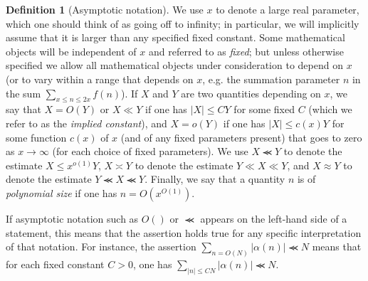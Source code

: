 \documentclass[12pt,a4paper,reqno]{amsart}
\numberwithin{equation}{section}
\theoremstyle{plain}
\theoremstyle{definition}
\newtheorem{definition}[theorem]{Definition}
\renewcommand{\sim}{\asymp}
\renewcommand{\lessapprox}{\llcurly}
\begin{document}
\begin{definition}[Asymptotic notation]\label{asym}  We use $x$ to denote a large real parameter, which one should think of as going off to infinity; in particular, we will implicitly assume that it is larger than any specified fixed constant. Some mathematical objects will be independent of $x$ and referred to as \emph{fixed}; but unless otherwise specified we allow all mathematical objects under consideration to depend on $x$ (or to vary within a range that depends on $x$, e.g. the summation parameter $n$ in the sum $\sum_{x \leq n \leq 2x} f(n)$).  If $X$ and $Y$ are two quantities depending on $x$, we say that $X = O(Y)$ or $X \ll Y$ if one has $|X| \leq CY$ for some fixed $C$ (which we refer to as the \emph{implied constant}), and $X = o(Y)$ if one has $|X| \leq c(x) Y$ for some function $c(x)$ of $x$ (and of any fixed parameters present) that goes to zero as $x \to \infty$ (for each choice of fixed parameters).  We use $X \lessapprox Y$ to denote the estimate $X \leq x^{o(1)} Y$, $X \sim Y$ to denote the estimate $Y \ll X \ll Y$, and $X \approx Y$ to denote the estimate $Y \lessapprox X \lessapprox Y$.  Finally, we say that a quantity $n$ is of \emph{polynomial size} if one has $n = O(x^{O(1)})$.

If asymptotic notation such as $O()$ or $\lessapprox$ appears on the left-hand side of a statement, this means that the assertion holds true for any specific interpretation of that notation.  For instance, the assertion $\sum_{n=O(N)} |\alpha(n)| \lessapprox N$ means that for each fixed constant $C>0$, one has $\sum_{|n| \leq CN} |\alpha(n)|\lessapprox N$.
\end{definition}
\end{document}
